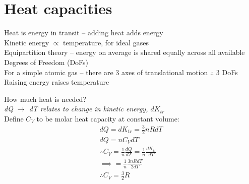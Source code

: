 \documentclass[a4paper, 11pt, fleqn, normalem]{report}
\begin{document}
\section{Heat capacities}
Heat is energy in transit -- adding heat adds energy \\
Kinetic energy $\propto$ temperature, for ideal gases \\
Equipartition theory -- energy on average is shared equally across all available Degrees of Freedom (DoFs) \\
For a simple atomic gas -- there are 3 axes of translational motion $\therefore$ 3 DoFs \\
Raising energy raises temperature

How much heat is needed? \\
\textit{dQ $\rightarrow$ dT relates to change in kinetic energy, $dK_{tr}$}\\
Define $C_{V}$ to be molar heat capacity at constant volume:
\begin{gather*}
	dQ = dK_{tr} = \frac{3}{2}nRdT \\
	dQ = nC_{V}dT \\
	\therefore C_{V} = \frac{1}{n}\frac{dQ}{dT} = \frac{1}{n}\frac{dK_{tr}}{dT} \\
	\implies = \frac{1}{n}\frac{3nRdT}{2dT} \\
	\therefore C_{V} = \frac{3}{2}R
\end{gather*}
\end{document}
